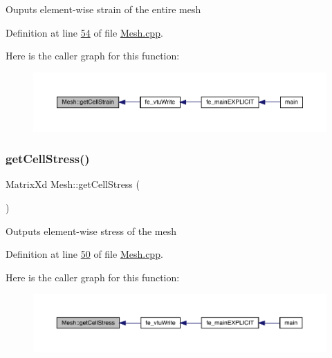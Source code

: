 Ouputs element-\/wise strain of the entire mesh 

Definition at line \hyperlink{_mesh_8cpp_source_l00054}{54} of file \hyperlink{_mesh_8cpp_source}{Mesh.\+cpp}.

Here is the caller graph for this function\+:\nopagebreak
\begin{figure}[H]
\begin{center}
\leavevmode
\includegraphics[width=350pt]{class_mesh_a1c54802401d00d14b390db2f0e615ebb_icgraph}
\end{center}
\end{figure}
\mbox{\label{class_mesh_a4ec62fd7219adcd406a167c1f6ee81e8}} 
\subsubsection{\texorpdfstring{get\+Cell\+Stress()}{getCellStress()}}
{\footnotesize\ttfamily Matrix\+Xd Mesh\+::get\+Cell\+Stress (\begin{DoxyParamCaption}{ }\end{DoxyParamCaption})}

Outputs element-\/wise stress of the mesh 

Definition at line \hyperlink{_mesh_8cpp_source_l00050}{50} of file \hyperlink{_mesh_8cpp_source}{Mesh.\+cpp}.

Here is the caller graph for this function\+:\nopagebreak
\begin{figure}[H]
\begin{center}
\leavevmode
\includegraphics[width=350pt]{class_mesh_a4ec62fd7219adcd406a167c1f6ee81e8_icgraph}
\end{center}
\end{figure}
\mbox{\label{class_mesh_a4828631f942fd5a701870beea870f413}} 
